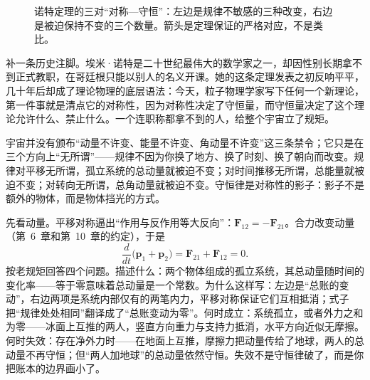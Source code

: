 \begin{figure}[htbp]
\centering
{}
\caption{诺特定理的三对“对称—守恒”：左边是规律不敏感的三种改变，右边是被迫保持不变的三个数量。箭头是定理保证的严格对应，不是类比。}
\end{figure}

补一条历史注脚。埃米·诺特是二十世纪最伟大的数学家之一，却因性别长期拿不到正式教职，在哥廷根只能以别人的名义开课。她的这条定理发表之初反响平平，几十年后却成了理论物理的底层语法：今天，粒子物理学家写下任何一个新理论，第一件事就是清点它的对称性，因为对称性决定了守恒量，而守恒量决定了这个理论允许什么、禁止什么。一个连职称都拿不到的人，给整个宇宙立了规矩。


\begin{oneline}
宇宙并没有颁布“动量不许变、能量不许变、角动量不许变”这三条禁令；它只是在三个方向上“无所谓”——规律不因为你换了地方、换了时刻、换了朝向而改变。规律对平移无所谓，孤立系统的总动量就被迫不变；对时间推移无所谓，总能量就被迫不变；对转向无所谓，总角动量就被迫不变。守恒律是对称性的影子：影子不是额外的物体，而是物体挡光的方式。
\end{oneline}


先看动量。平移对称逼出“作用与反作用等大反向”：\(\mathbf F_{12}=-\mathbf F_{21}\)。合力改变动量（第~6~章和第~10~章的约定），于是
\[
\frac{d}{dt}\bigl(\mathbf p_1+\mathbf p_2\bigr)=\mathbf F_{21}+\mathbf F_{12}=0 .
\]
按老规矩回答四个问题。描述什么：两个物体组成的孤立系统，其总动量随时间的变化率——等于零意味着总动量是一个常数。为什么这样写：左边是“总账的变动”，右边两项是系统内部仅有的两笔内力，平移对称保证它们互相抵消；式子把“规律处处相同”翻译成了“总账变动为零”。何时成立：系统孤立，或者外力之和为零——冰面上互推的两人，竖直方向重力与支持力抵消，水平方向近似无摩擦。何时失效：存在净外力时——在地面上互推，摩擦力把动量传给了地球，两人的总动量不再守恒；但“两人加地球”的总动量依然守恒。失效不是守恒律破了，而是你把账本的边界画小了。

